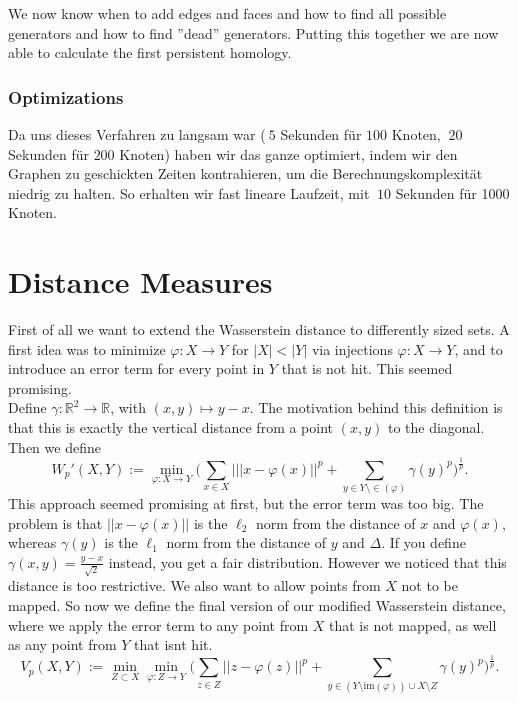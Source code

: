 \documentclass[11pt, a4paper,draft]{report}
\newcommand{\bR}{\mathbb{R}}
\newcommand{\im}{\textrm{im}}
\begin{document}
We now know when to add edges and faces and how to find all possible generators and how to find ''dead'' generators. Putting this together we are now able to calculate the first persistent homology.
 	
 	\subsection{Optimizations}
 	
 	Da uns dieses Verfahren zu langsam war ($~5$ Sekunden für $100$ Knoten, $~20$ Sekunden für $200$ Knoten) haben wir das ganze optimiert, indem wir den Graphen zu geschickten Zeiten kontrahieren, um die Berechnungskomplexität niedrig zu halten. So erhalten wir fast lineare Laufzeit, mit $~10$ Sekunden für 1000 Knoten.
 	
 	
 	\chapter{Distance Measures}
 	
 	First of all we want to extend the Wasserstein distance to differently sized sets. A first idea was to minimize $\varphi:X\rightarrow Y$ for $|X|<|Y|$ via injections $\varphi:X\rightarrow Y$, and to introduce an error term for every point in $Y$ that is not hit. This seemed promising.\\
Define $\gamma:\bR^2\rightarrow\bR$, with $(x,y)\mapsto y-x$. The motivation behind this definition is that this is exactly the vertical distance from a point $(x,y)$ to the diagonal. Then we define $$W_p'(X,Y):=\min_{\varphi:X\rightarrow Y}\bigg(\sum_{x\in X}|||x-\varphi(x)||^p + \sum_{y\in Y\setminus \in(\varphi)}\gamma(y)^p\bigg)^\frac{1}{p}.$$
This approach seemed promising at first, but the error term was too big. The problem is that $||x-\varphi(x)||$ is the $\ell_2$ norm from the distance of $x$ and $\varphi(x)$, whereas $\gamma(y)$ is the $\ell_1$ norm from the distance of $y$ and $\Delta$. If you define $\gamma(x,y)=\frac{y-x}{\sqrt{2}}$ instead, you get a fair distribution. However we noticed that this distance is too restrictive. We also want to allow points from $X$ not to be mapped. So now we define the final version of our modified Wasserstein distance, where we apply the error term to any point from $X$ that is not mapped, as well as any point from $Y$ that isnt hit.
$$V_p(X,Y):=\min_{Z\subset{X}}\min_{\varphi:Z\rightarrow Y}\bigg(\sum_{z\in Z}||z-\varphi(z)||^p + \sum_{y\in (Y\setminus \im(\varphi))\cup X\setminus Z}\gamma(y)^p\bigg)^\frac{1}{p}.$$
\end{document}
